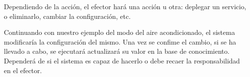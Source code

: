 Dependiendo de la acción, el efector hará una acción u otra: deplegar un servicio, o eliminarlo, cambiar la configuración, etc.

Continuando con nuestro ejemplo del modo del aire acondicionado, el sistema modificaría la configuración del mismo. Una vez se confime el cambio, si se ha llevado a cabo, se ejecutará actualizará su valor en la base de conocimiento. Dependerá de si el sistema es capaz de hacerlo o debe recaer la responsabilidad en el efector.
